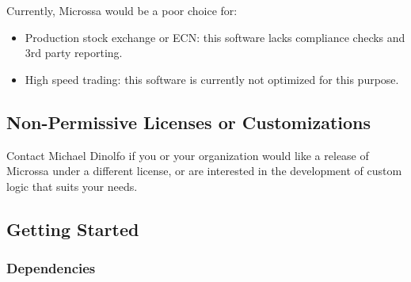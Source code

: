 \documentclass[Letter]{article}
\begin{document}
Currently, Microssa would be a poor choice for:

\begin{itemize}
    \item Production stock exchange or ECN: this software lacks
    compliance checks and 3rd party reporting.
    \item High speed trading: this software is currently not optimized
    for this purpose.
\end{itemize}


\subsection{Non-Permissive Licenses or Customizations}

Contact Michael Dinolfo if you or your organization would like a release
of Microssa under a different license, or are interested in the
development of custom logic that suits your needs.

\subsection{Getting Started}

\subsubsection{Dependencies}
\end{document}
